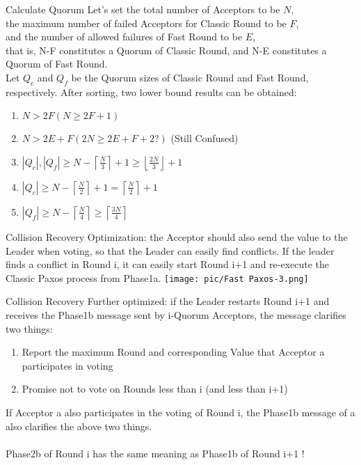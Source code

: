 \documentclass[10pt]{beamer}
\begin{document}
\begin{frame}[fragile]{Calculate Quorum}
    Let’s set the total number of Acceptors to be $N$,\\
    the maximum number of failed Acceptors for Classic Round to be $F$,\\
    and the number of allowed failures of Fast Round to be $E$,\\
    that is, N-F constitutes a Quorum of Classic Round, and N-E constitutes a Quorum of Fast Round.\\
    Let $Q_c$ and $Q_f$ be the Quorum sizes of Classic Round and Fast Round, respectively. After sorting, two lower bound results can be obtained:
    \begin{enumerate}
        \item $N > 2F (N \ge 2F + 1)$
        \item $N > 2E + F (2N \ge 2E + F + 2 ?)$ (Still Confused)
        \item $|Q_c| , |Q_f| \ge N - \left \lceil \frac{N}{3} \right \rceil + 1 \ge \left\lfloor \frac{2N}{3} \right \rfloor + 1$
        \item $|Q_c| \ge N - \left\lceil \frac{N}{2} \right\rceil + 1 = \left\lceil \frac{N}{2} \right\rceil+1$
        \item $|Q_f| \ge N - \left\lceil \frac{N}{4} \right\rceil \ge \left\lceil \frac{3N}{4} \right\rceil$
    \end{enumerate}
\end{frame}

\begin{frame}[fragile]{Collision Recovery}
    Optimization: the Acceptor should also send the value to the Leader when voting, so that the Leader can easily find conflicts. If the leader finds a conflict in Round i, it can easily start Round i+1 and re-execute the Classic Paxos process from Phase1a.
    \texttt{[image: pic/Fast Paxos-3.png]}
\end{frame}

\begin{frame}[fragile]{Collision Recovery}
    Further optimized: if the Leader restarts Round i+1 and receives the Phase1b message sent by i-Quorum Acceptors, the message clarifies two things:
    \begin{enumerate}
        \item Report the maximum Round and corresponding Value that Acceptor a participates in voting
        \item Promise not to vote on Rounds less than i (and less than i+1)
    \end{enumerate}
    If Acceptor a also participates in the voting of Round i, the Phase1b message of a also clarifies the above two things. \\
    ~\\
    Phase2b of Round i has the same meaning as Phase1b of Round i+1 !
\end{frame}
\end{document}
